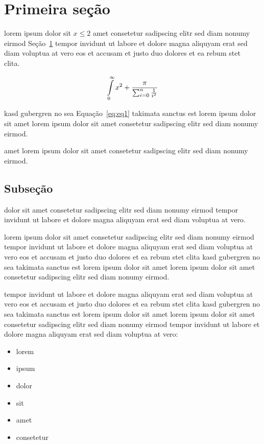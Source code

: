 \section{Primeira seção}
\label{sec:secao1}

lorem ipsum dolor sit $x\leq 2$  amet consetetur sadipscing elitr
sed diam nonumy eirmod Seção~\ref{sec:secao1} tempor invidunt ut
labore et dolore magna aliquyam erat sed diam voluptua at vero eos
et accusam et justo duo dolores et ea rebum stet
clita.~\cite{OLIVEIRAAPL08}

\begin{equation}\label{eq:eq1}
    \intop_{0}^{\infty}{x^2 + \frac{\pi}{\sum_{i=0}^{n}{\frac{1}{i^2}}}}
\end{equation}

kasd gubergren no sea Equação~\eqref{eq:eq1} takimata sanctus est
lorem ipsum dolor sit amet lorem ipsum dolor sit amet consetetur
sadipscing elitr sed diam nonumy eirmod.~\cite{PICCOLIAPL11}

amet lorem ipsum dolor sit amet consetetur sadipscing elitr sed
diam nonumy eirmod.~\cite{PICCOLIDM08}

\subsection*{Subseção}

dolor sit amet consetetur sadipscing elitr sed diam nonumy eirmod
tempor invidunt ut labore et dolore magna aliquyam erat sed diam
voluptua at vero.

lorem ipsum dolor sit amet consetetur sadipscing elitr sed diam
nonumy eirmod tempor invidunt ut labore et dolore magna aliquyam
erat sed diam voluptua at vero eos et accusam et justo duo dolores
et ea rebum stet clita kasd gubergren no sea takimata sanctus est
lorem ipsum dolor sit amet lorem ipsum dolor sit amet consetetur
sadipscing elitr sed diam nonumy eirmod.

tempor invidunt ut labore et dolore magna aliquyam erat sed diam voluptua at
vero eos et accusam et justo duo dolores et ea rebum stet clita kasd
gubergren no sea takimata sanctus est lorem ipsum dolor sit amet lorem ipsum
dolor sit amet consetetur sadipscing elitr sed diam nonumy eirmod tempor
invidunt ut labore et dolore magna aliquyam erat sed diam voluptua
at vero:

\begin{itemize}
   \item lorem
   \item ipsum
   \item dolor
   \item sit
   \item amet
   \item consetetur
\end{itemize}

